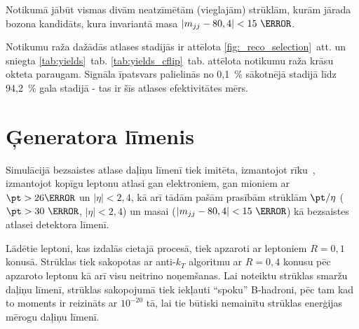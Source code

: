 Notikumā jābūt vismas divām neatzīmētām (vieglajām) strūklām, kurām jārada \PW bozona kandidāts, kura invariantā masa $\left|m_{jj}-80,4\right|<15~\GeV$.

Notikumu raža dažādās atlases stadijās ir attēlota \ref{fig:_reco_selection}~att. un sniegta \ref{tab:yields}~tab. \ref{tab:yields_cflip}~tab. attēlota notikumu raža krāsu okteta \PW paraugam. Signāla īpatsvars palielinās no 0,1~\% sākotnējā stadijā līdz 94,2~\% gala stadijā - tas ir šīs atlases efektivitātes mērs.






\section{Ģeneratora līmenis}
\label{sec:generator_level}

Simulācijā bezsaistes atlase daļiņu līmenī tiek imitēta, izmantojot \PSEUDOTOPPRODUCER rīku~\cite{code:pseudotop}, izmantojot kopīgu leptonu atlasi gan elektroniem, gan mioniem ar $\pt>26\GeV$ un $|\eta|<2,4$, kā arī tādām pašām prasībām strūklām $\pt/\eta$ ($\pt>30~\GeV$, $|\eta|<2,4$) un \PW masai ($\left|m_{jj}-80,4\right|<15~\GeV$) kā bezsaistes atlasei detektora līmenī.

Lādētie leptoni, kas izdalās cietajā procesā, tiek apzaroti ar leptoniem $R=0,1$ konusā. Strūklas tiek sakopotas ar anti-$k_T$ algoritmu ar $R=0,4$ konusu pēc apzaroto leptonu kā arī visu neitrino noņemšanas. Lai noteiktu strūklas smaržu daļiņu līmenī, strūklas sakopojumā tiek iekļauti ``spoku'' B-hadroni, pēc tam kad to moments ir reizināts ar $10^{-20}$ tā, lai tie būtiski nemainītu strūklas enerģijas mērogu daļiņu līmenī.
